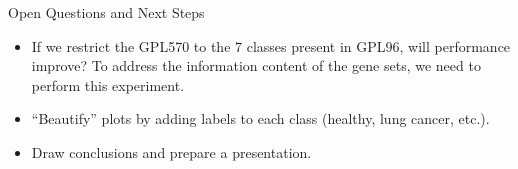 \documentclass{beamer}
\begin{document}
    \begin{frame}{Open Questions and Next Steps}
        \begin{itemize} \setlength\itemsep{15pt}
            \item {
                If we restrict the GPL570 to the 7 classes present in GPL96,
                will performance improve? To address the information
                content of the gene sets, we need to 
                perform this experiment.
            }
            \item {
                ``Beautify'' plots by adding labels to each class (healthy, lung cancer, etc.).
            }
            \item {
                Draw conclusions and prepare a presentation.
            }
        \end{itemize}
    \end{frame}
\end{document}

